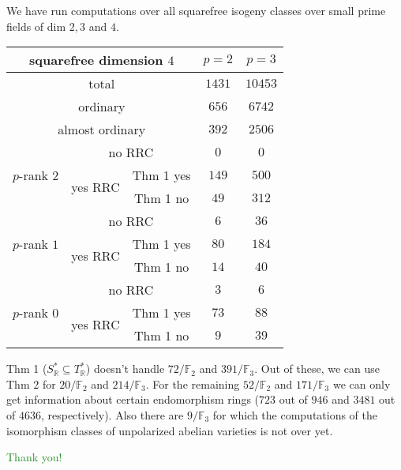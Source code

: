 \documentclass[usenames,dvipsnames]{beamer}
\def\R{\mathbb{R}}
\def\F{\mathbb{F}}
\newcommand{\green}[1]{\textcolor{ForestGreen}{#1}}
\begin{document}
\begin{frame}{ }{}
{\small
	We have run computations over all squarefree isogeny classes over small prime fields of dim $2,3$ and $4$.
}
\pause 
\begin{table}[ht]
    \centering
\footnotesize	
    \begin{tabular}{|c|c|c|c|c|}\hline
\multicolumn{3}{|c|}{squarefree dimension $4$}                  & $p=2$ & $p=3$ \\\hline
\multicolumn{3}{|c|}{total}                                     & $1431$ & $10453$  \\\hline                    
\multicolumn{3}{|c|}{ordinary}                                  & $656$ & $6742$  \\\hline
\multicolumn{3}{|c|}{almost ordinary}                           & $392$ & $2506$  \\\hline
\multirow{3}{*}{$p$-rank $2$} & \multicolumn{2}{|c|}{no RRC}    & $0$ & $0$ \\\cline{2-5}
                              & \multirow{2}{*}{yes RRC} & Thm 1 yes & $149$ & $500$   \\\cline{3-5}
                              &                          & Thm 1 no  & $49$ & $312$   \\\hline
\multirow{3}{*}{$p$-rank $1$} & \multicolumn{2}{|c|}{no RRC}    & $6$ & $36$ \\\cline{2-5}
                              & \multirow{2}{*}{yes RRC} & Thm 1 yes & $80$ & $184$   \\\cline{3-5}
                              &                          & Thm 1 no  & $14$ & $40$   \\\hline
\multirow{3}{*}{$p$-rank $0$} & \multicolumn{2}{|c|}{no RRC}    & $3$ & $6$   \\\cline{2-5}
                              & \multirow{2}{*}{yes RRC} & Thm 1 yes & $73$ & $88$ \\\cline{3-5}
                              &                          & Thm 1 no  & $9$ & $39$ \\\hline                              
    \end{tabular}
    \label{tab:dim4}
\end{table}
\pause
{\small
	Thm 1 ($S^*_\R\subseteq T^*_\R$) doesn't handle $72/\F_2$ and $391/\F_3$.
\pause	
	Out of these, we can use Thm 2 for $20/\F_2$ and $214/\F_3$.
\pause
	For the remaining $52/\F_2$ and $171/\F_3$ we can only get information about certain endomorphism rings ($723$ out of $946$ and $3481$ out of $4636$, respectively).
\pause	
	Also there are $9/\F_3$ for which the computations of the isomorphism classes of unpolarized abelian varieties is not over yet.
}
\end{frame}

\begin{frame}{  }
    \begin{center}
    \green{\huge Thank you!}
    \end{center}  
\end{frame}
\end{document}
